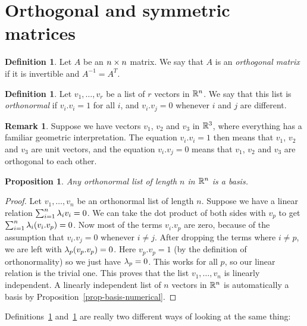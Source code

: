 \documentclass[reqno]{amsart}
\newtheorem{proposition}[theorem]{Proposition}
\theoremstyle{definition}
\newtheorem{remark}[theorem]{Remark}
\newtheorem{definition}[theorem]{Definition}
\newcommand{\dfn}[1]{\emph{{#1}}\index{#1}}
\begin{document}
\section{Orthogonal and symmetric matrices}
\label{sec-symmetric}

\begin{definition}\label{defn-orthogonal}
 Let $A$ be an $n\times n$ matrix.  We say that $A$ is an
 \dfn{orthogonal matrix} if it is invertible and $A^{-1}=A^T$.
\end{definition}

\begin{definition}\label{defn-orthonormal}
 Let $v_1,\dotsc,v_r$ be a list of $r$ vectors in ${\mathbb{R}}^n$.  We say that
 this list is \dfn{orthonormal} if $v_i.v_i=1$ for all $i$, and
 $v_i.v_j=0$ whenever $i$ and $j$ are different.
\end{definition}

\begin{remark}
 Suppose we have vectors $v_1$, $v_2$ and $v_3$ in ${\mathbb{R}}^3$, where
 everything has a familiar geometric interpretation.  The equation
 $v_i.v_i=1$ then means that $v_1$, $v_2$ and $v_3$ are unit vectors,
 and the equation $v_i.v_j=0$ means that $v_1$, $v_2$ and $v_3$ are
 orthogonal to each other.
\end{remark}

\begin{proposition}\label{prop-orthonormal-basis}
 Any orthonormal list of length $n$ in ${\mathbb{R}}^n$ is a basis.
\end{proposition}
\begin{proof}
 Let $v_1,\dotsc,v_n$ be an orthonormal list of length $n$.  Suppose
 we have a linear relation $\sum_{i=1}^n\lambda_iv_i=0$.  We can take the
 dot product of both sides with $v_p$ to get
 $\sum_{i=1}^n\lambda_i(v_i.v_p)=0$.  Now most of the terms $v_i.v_p$ are
 zero, because of the assumption that $v_i.v_j=0$ whenever $i\neq j$.
 After dropping the terms where $i\neq p$, we are left with
 $\lambda_p(v_p.v_p)=0$.  Here $v_p.v_p=1$ (by the definition of
 orthonormality) so we just have $\lambda_p=0$.  This works for all $p$,
 so our linear relation is the trivial one.  This proves that the list
 $v_1,\dotsc,v_n$ is linearly independent.  A linearly independent
 list of $n$ vectors in ${\mathbb{R}}^n$ is automatically a basis by
 Proposition~\ref{prop-basis-numerical}. 
\end{proof}

Definitions~\ref{defn-orthogonal} and~\ref{defn-orthonormal} are
really two different ways of looking at the same thing:
\end{document}
